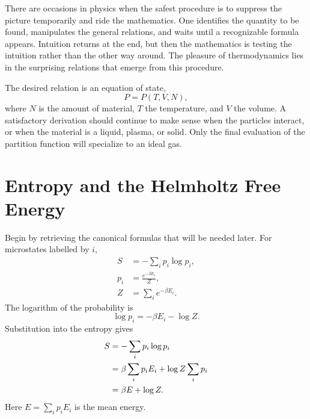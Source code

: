 There are occasions in physics when the safest procedure is to suppress the
picture temporarily and ride the mathematics.  One identifies the quantity
to be found, manipulates the general relations, and waits until a recognizable
formula appears.  Intuition returns at the end, but then the mathematics is
testing the intuition rather than the other way around.  The pleasure of
thermodynamics lies in the surprising relations that emerge from this
procedure.

The desired relation is an equation of state,
\begin{equation}
 P=P(T,V,N),
 \label{eq:sm5-equation-of-state-target}
\end{equation}
where \(N\) is the amount of material, \(T\) the temperature, and \(V\) the
volume.  A satisfactory derivation should continue to make sense when the
particles interact, or when the material is a liquid, plasma, or solid.  Only
the final evaluation of the partition function will specialize to an ideal
gas.

\section{Entropy and the Helmholtz Free Energy}

Begin by retrieving the canonical formulas that will be needed later.  For
microstates labelled by \(i\),
\begin{equation}
 \begin{aligned}
 S&=-\sum_i p_i\log p_i,\\
 p_i&=\frac{e^{-\beta E_i}}{Z},\\
 Z&=\sum_i e^{-\beta E_i}.
 \end{aligned}
 \label{eq:sm5-canonical-definitions}
\end{equation}
The logarithm of the probability is
\begin{equation}
 \log p_i=-\beta E_i-\log Z.
 \label{eq:sm5-log-probability}
\end{equation}
Substitution into the entropy gives
\begin{align}
 S
 &=-\sum_i p_i\log p_i \notag\\
 &=\beta\sum_i p_iE_i+\log Z\sum_i p_i \notag\\
 &=\beta E+\log Z.
 \label{eq:sm5-entropy-log-z}
\end{align}
Here \(E=\sum_i p_iE_i\) is the mean energy.

\begin{classroomqa}
\end{classroomqa}

